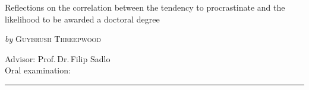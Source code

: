 \begin{titlepage}
  \phantom{}
  \vfill 
  \begin{center}
    \begin{singlespace*}
      \begin{Huge}
          Reflections on the correlation between the tendency to procrastinate and the likelihood to be awarded a doctoral degree\par
      \end{Huge}
      \vskip 0.25cm
      \emph{by}
      \vskip 0.25cm
      \textsc{Guybrush Threepwood}\par
    \end{singlespace*}
  \end{center}
  \vfill
  \begin{singlespace*}
    Advisor:            Prof.\,Dr.\,Filip Sadlo \\[.5cm]
    Oral examination: \rule{4cm}{0.15mm}
  \end{singlespace*}
\end{titlepage}

\newpage
\null
\thispagestyle{empty}
\newpage

